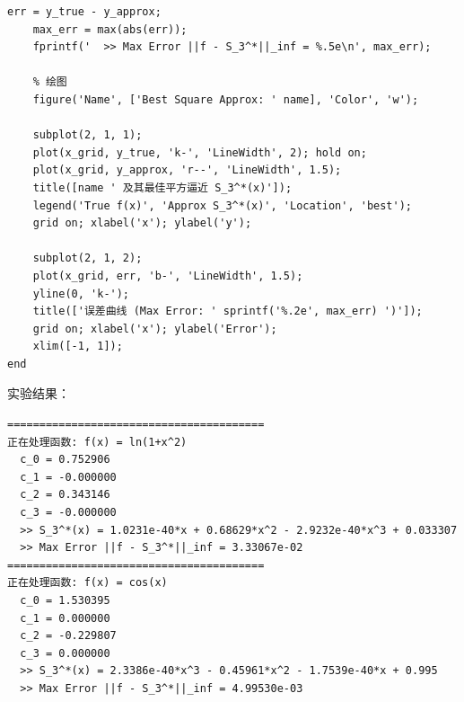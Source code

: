 \documentclass[UTF8, a4paper, 11pt]{ctexart}
\begin{document}
\begin{lstlisting}[caption={用Chebyshev多项式对$\cos(x)$和$\ln(1+x^2)$的最佳平方逼近与拟合效果}]
    err = y_true - y_approx;
    max_err = max(abs(err));
    fprintf('  >> Max Error ||f - S_3^*||_inf = %.5e\n', max_err);
    
    % 绘图
    figure('Name', ['Best Square Approx: ' name], 'Color', 'w');
    
    subplot(2, 1, 1);
    plot(x_grid, y_true, 'k-', 'LineWidth', 2); hold on;
    plot(x_grid, y_approx, 'r--', 'LineWidth', 1.5);
    title([name ' 及其最佳平方逼近 S_3^*(x)']);
    legend('True f(x)', 'Approx S_3^*(x)', 'Location', 'best');
    grid on; xlabel('x'); ylabel('y');
    
    subplot(2, 1, 2);
    plot(x_grid, err, 'b-', 'LineWidth', 1.5);
    yline(0, 'k-');
    title(['误差曲线 (Max Error: ' sprintf('%.2e', max_err) ')']);
    grid on; xlabel('x'); ylabel('Error');
    xlim([-1, 1]);
end
\end{lstlisting}

实验结果：
\begin{lstlisting}
========================================
正在处理函数: f(x) = ln(1+x^2)
  c_0 = 0.752906
  c_1 = -0.000000
  c_2 = 0.343146
  c_3 = -0.000000
  >> S_3^*(x) = 1.0231e-40*x + 0.68629*x^2 - 2.9232e-40*x^3 + 0.033307
  >> Max Error ||f - S_3^*||_inf = 3.33067e-02
========================================
正在处理函数: f(x) = cos(x)
  c_0 = 1.530395
  c_1 = 0.000000
  c_2 = -0.229807
  c_3 = 0.000000
  >> S_3^*(x) = 2.3386e-40*x^3 - 0.45961*x^2 - 1.7539e-40*x + 0.995
  >> Max Error ||f - S_3^*||_inf = 4.99530e-03
\end{lstlisting}
\end{document}
